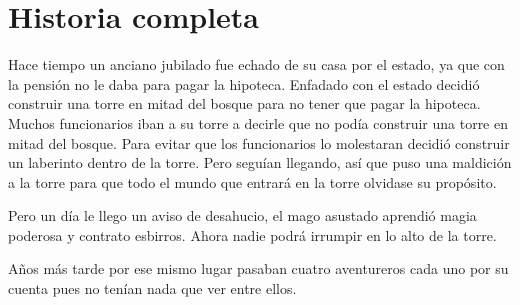 \section{Historia completa}%


Hace tiempo un anciano jubilado fue echado de su casa por el estado, ya que con la pensión no le daba para pagar la hipoteca. Enfadado con el estado decidió construir una  torre en mitad del bosque para no tener que pagar la hipoteca. Muchos funcionarios iban a su torre a decirle que no podía construir una torre en mitad del bosque. Para evitar que los funcionarios lo molestaran decidió construir un laberinto dentro de la torre. Pero seguían llegando, así que puso una maldición a la torre para que todo el mundo que entrará en la torre olvidase su propósito.

Pero un día le llego un aviso de desahucio, el mago asustado aprendió magia poderosa y contrato esbirros. Ahora nadie podrá irrumpir en lo alto de la torre.

Años más tarde por ese mismo lugar pasaban cuatro aventureros cada uno por su cuenta pues no tenían nada que ver entre ellos.